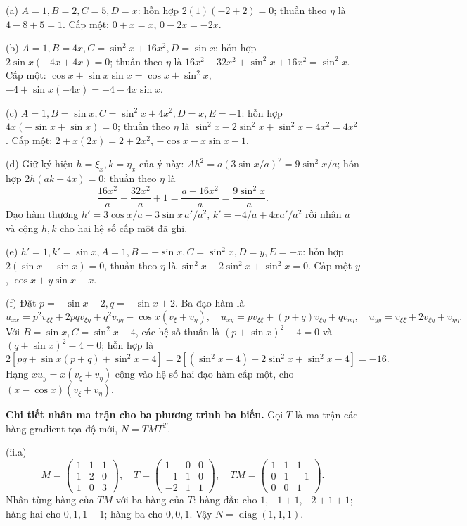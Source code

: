 (a) $A=1,B=2,C=5,D=x$: hỗn hợp $2(1)(-2+2)=0$; thuần theo $\eta$ là $4-8+5=1$. Cấp một: $0+x=x$, $0-2x=-2x$.

(b) $A=1,B=4x,C=\sin^2x+16x^2,D=\sin x$: hỗn hợp $2\sin x(-4x+4x)=0$; thuần theo $\eta$ là $16x^2-32x^2+\sin^2x+16x^2=\sin^2x$. Cấp một: $\cos x+\sin x\sin x=\cos x+\sin^2x$, $-4+\sin x(-4x)=-4-4x\sin x$.

(c) $A=1,B=\sin x,C=\sin^2x+4x^2,D=x,E=-1$: hỗn hợp $4x(-\sin x+\sin x)=0$; thuần theo $\eta$ là $\sin^2x-2\sin^2x+\sin^2x+4x^2=4x^2$. Cấp một: $2+x(2x)=2+2x^2$, $-\cos x-x\sin x-1$.

(d) Giữ ký hiệu $h=\xi_x,k=\eta_x$ của ý này: $Ah^2=a(3\sin x/a)^2=9\sin^2x/a$; hỗn hợp $2h(ak+4x)=0$; thuần theo $\eta$ là
\[\frac{16x^2}a-\frac{32x^2}a+1=\frac{a-16x^2}a=\frac{9\sin^2x}a.\]
Đạo hàm thương $h'=3\cos x/a-3\sin x\,a'/a^2$, $k'=-4/a+4xa'/a^2$ rồi nhân $a$ và cộng $h,k$ cho hai hệ số cấp một đã ghi.

(e) $h'=1,k'=\sin x,A=1,B=-\sin x,C=\sin^2x,D=y,E=-x$: hỗn hợp $2(\sin x-\sin x)=0$, thuần theo $\eta$ là $\sin^2x-2\sin^2x+\sin^2x=0$. Cấp một $y$, $\cos x+y\sin x-x$.

(f) Đặt $p=-\sin x-2,q=-\sin x+2$. Ba đạo hàm là
\[u_{xx}=p^2v_{\xi\xi}+2pqv_{\xi\eta}+q^2v_{\eta\eta}-\cos x(v_\xi+v_\eta),\quad
u_{xy}=pv_{\xi\xi}+(p+q)v_{\xi\eta}+qv_{\eta\eta},\quad
u_{yy}=v_{\xi\xi}+2v_{\xi\eta}+v_{\eta\eta}.\]
Với $B=\sin x,C=\sin^2x-4$, các hệ số thuần là $(p+\sin x)^2-4=0$ và $(q+\sin x)^2-4=0$; hỗn hợp là
\[2[pq+\sin x(p+q)+\sin^2x-4]
=2[(\sin^2x-4)-2\sin^2x+\sin^2x-4]=-16.\]
Hạng $xu_y=x(v_\xi+v_\eta)$ cộng vào hệ số hai đạo hàm cấp một, cho $(x-\cos x)(v_\xi+v_\eta)$.

\textbf{Chi tiết nhân ma trận cho ba phương trình ba biến.} Gọi $T$ là ma trận các hàng gradient tọa độ mới, $N=TMT^T$.

(ii.a)
\[M=\begin{pmatrix}1&1&1\\1&2&0\\1&0&3\end{pmatrix},\quad
T=\begin{pmatrix}1&0&0\\-1&1&0\\-2&1&1\end{pmatrix},\quad
TM=\begin{pmatrix}1&1&1\\0&1&-1\\0&0&1\end{pmatrix}.\]
Nhân từng hàng của $TM$ với ba hàng của $T$: hàng đầu cho $1,-1+1,-2+1+1$; hàng hai cho $0,1,1-1$; hàng ba cho $0,0,1$. Vậy $N=\operatorname{diag}(1,1,1)$.

